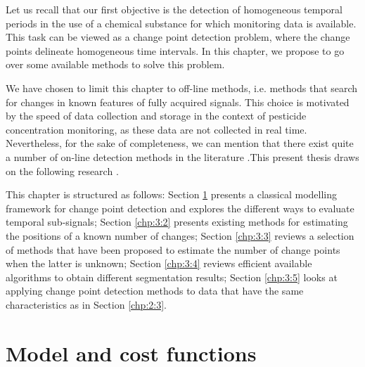 Let us recall that our first objective is the detection of homogeneous temporal periods in the use of a chemical substance for which monitoring data is available. This task can be viewed as a change point detection problem, where the change points delineate homogeneous time intervals. In this chapter, we propose to go over some available methods to solve this problem.  

We have chosen to limit this chapter to off-line methods, i.e. methods that search for changes in known features of fully acquired signals. This choice is motivated by the speed of data collection and storage in the context of pesticide concentration monitoring, as these data are not collected in real time. Nevertheless, for the sake of completeness, we can mention that there exist quite a number of on-line detection methods in the literature \citep{liu2017change,Li2021,hohle2010online,ranganathan2010pliss,li2015m}.This present thesis draws on the following research \citep{truong2020,basseville1993detection,bardet2020}. 

This chapter is structured as follows: Section \ref{chp:3:1} presents a classical modelling framework for change point detection and explores the different ways to evaluate temporal sub-signals; Section \ref{chp:3:2} presents existing methods for estimating the positions of a known number of changes; Section \ref{chp:3:3} reviews a selection of methods that have been proposed to estimate the number of change points when the latter is unknown; Section \ref{chp:3:4} reviews efficient available algorithms to obtain different segmentation results; Section \ref{chp:3:5} looks at applying change point detection methods to data that have the same characteristics as in Section \ref{chp:2:3}.

\section{Model and cost functions}\label{chp:3:1}


